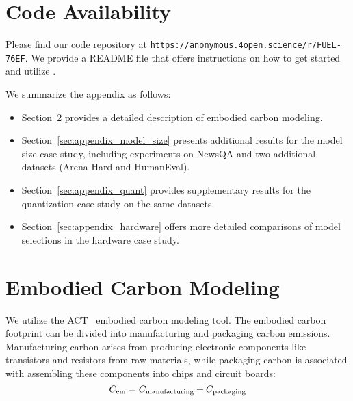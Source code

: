 \section{Code Availability}
Please find our code repository at \texttt{https://anonymous.4open.science/r/FUEL-76EF}. We provide a README file that offers instructions on how to get started and utilize \SYSTEM{}.

We summarize the appendix as follows:

\begin{itemize}
    \item Section~\ref{sec:appendix_emb} provides a detailed description of embodied carbon modeling.
    \item Section~\ref{sec:appendix_model_size} presents additional results for the model size case study, including experiments on NewsQA and two additional datasets (Arena Hard and HumanEval).
    \item Section~\ref{sec:appendix_quant} provides supplementary results for the quantization case study on the same datasets.
    \item Section~\ref{sec:appendix_hardware} offers more detailed comparisons of model selections in the hardware case study.
\end{itemize}








\section{Embodied Carbon Modeling}\label{sec:appendix_emb}
We utilize the ACT~\cite{gupta2022act} embodied carbon modeling tool. The embodied carbon footprint can be divided into manufacturing and packaging carbon emissions. Manufacturing carbon arises from producing electronic components like transistors and resistors from raw materials, while packaging carbon is associated with assembling these components into chips and circuit boards:
\begin{equation}
    C_{\rm em} = C_{\rm manufacturing} + C_{\rm packaging}
\end{equation}

